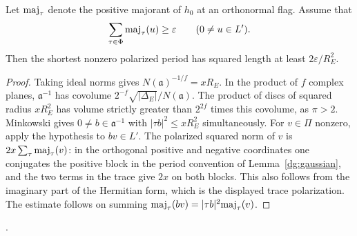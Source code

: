\begin{lemma}\label{bfam:minimum}
Let \({\rm maj}_\tau\) denote the positive majorant of \(h_0\)
at an orthonormal flag. Assume that
\[
        \sum_{\tau\in\Phi}{\rm maj}_\tau(u)\ge\varepsilon
                 \qquad(0\ne u\in L').
\]
Then the shortest nonzero polarized period
has squared length at least \(2\varepsilon/R_E^2\).
\end{lemma}
\begin{proof}
Taking ideal norms gives \(N(\mathfrak a)^{-1/f}=xR_E\).
In the product of \(f\) complex planes, \(\mathfrak a^{-1}\)
has covolume \(2^{-f}\sqrt{|\Delta_E|}/N(\mathfrak a)\).
The product of discs of squared radius \(xR_E^2\) has volume
strictly greater than \(2^{2f}\) times this covolume, as
\(\pi>2\). Minkowski gives \(0\ne b\in\mathfrak a^{-1}\)
with \(|\tau b|^2\le xR_E^2\) simultaneously. For \(v\in\Pi\)
nonzero, apply the hypothesis to \(bv\in L'\).
The polarized squared norm of \(v\) is
\(2x\sum_\tau{\rm maj}_\tau(v)\): in the orthogonal positive
and negative coordinates one conjugates the positive block in the
period convention of Lemma~\ref{dg:gaussian}, and the two terms
in the trace give \(2x\) on both
blocks. This also follows from the imaginary part of the Hermitian
form, which is the displayed trace polarization. The estimate
follows on summing
\({\rm maj}_\tau(bv)=|\tau b|^2{\rm maj}_\tau(v)\).
\end{proof}
.

